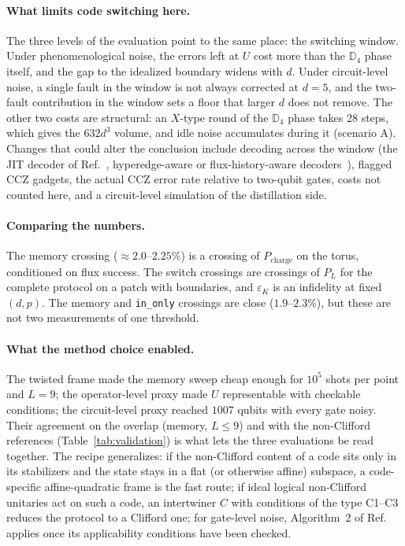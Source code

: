 \documentclass[a4paper]{article}
\newcommand{\cs}[1]{\texttt{#1}}
\newcommand{\Pch}{P_{\mathrm{charge}}}
\newcommand{\epsK}{\varepsilon_K}
\begin{document}
\paragraph{What limits code switching here.}
The three levels of the evaluation point to the same place: the switching window. Under phenomenological noise, the errors left at $U$ cost more than the $\mathbb{D}_4$ phase itself, and the gap to the idealized boundary widens with $d$. Under circuit-level noise, a single fault in the window is not always corrected at $d=5$, and the two-fault contribution in the window sets a floor that larger $d$ does not remove. The other two costs are structural: an $X$-type round of the $\mathbb{D}_4$ phase takes 28 steps, which gives the $632d^3$ volume, and idle noise accumulates during it (scenario A). Changes that could alter the conclusion include decoding across the window (the JIT decoder of Ref.~\cite{davydova2025knots}, hyperedge-aware or flux-history-aware decoders~\cite{magdalena2026}), flagged CCZ gadgets, the actual CCZ error rate relative to two-qubit gates, costs not counted here, and a circuit-level simulation of the distillation side.

\paragraph{Comparing the numbers.}
The memory crossing ($\approx2.0$--$2.25\%$) is a crossing of $\Pch$ on the torus, conditioned on flux success. The switch crossings are crossings of $P_L$ for the complete protocol on a patch with boundaries, and $\epsK$ is an infidelity at fixed $(d,p)$. The memory and \cs{in\_only} crossings are close ($1.9$--$2.3\%$), but these are not two measurements of one threshold.

\paragraph{What the method choice enabled.}
The twisted frame made the memory sweep cheap enough for $10^5$ shots per point and $L=9$; the operator-level proxy made $U$ representable with checkable conditions; the circuit-level proxy reached $1007$ qubits with every gate noisy. Their agreement on the overlap (memory, $L\le9$) and with the non-Clifford references (Table~\ref{tab:validation}) is what lets the three evaluations be read together. The recipe generalizes: if the non-Clifford content of a code sits only in its stabilizers and the state stays in a flat (or otherwise affine) subspace, a code-specific affine-quadratic frame is the fast route; if ideal logical non-Clifford unitaries act on such a code, an intertwiner $C$ with conditions of the type C1--C3 reduces the protocol to a Clifford one; for gate-level noise, Algorithm~2 of Ref.~\cite{takada2026exact} applies once its applicability conditions have been checked.
\end{document}
